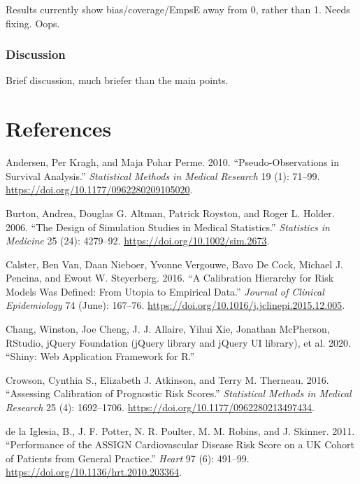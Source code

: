 \documentclass[
]{article}
\newlength{\cslhangindent}
\newenvironment{cslreferences}%
  {\setlength{\parindent}{0pt}%
  \everypar{\setlength{\hangindent}{\cslhangindent}}\ignorespaces}%
  {\par}
\begin{document}
Results currently show bias/coverage/EmpsE away from 0, rather than 1. Needs fixing. Oops.

\hypertarget{discussion-2}{%
\subsubsection{Discussion}\label{discussion-2}}

Brief discussion, much briefer than the main points.

\hypertarget{references}{%
\section*{References}\label{references}}

\hypertarget{refs}{}
\begin{cslreferences}
\leavevmode\hypertarget{ref-andersen_pseudo-observations_2010}{}%
Andersen, Per Kragh, and Maja Pohar Perme. 2010. ``Pseudo-Observations in Survival Analysis.'' \emph{Statistical Methods in Medical Research} 19 (1): 71--99. \url{https://doi.org/10.1177/0962280209105020}.

\leavevmode\hypertarget{ref-burton_design_2006}{}%
Burton, Andrea, Douglas G. Altman, Patrick Royston, and Roger L. Holder. 2006. ``The Design of Simulation Studies in Medical Statistics.'' \emph{Statistics in Medicine} 25 (24): 4279--92. \url{https://doi.org/10.1002/sim.2673}.

\leavevmode\hypertarget{ref-calster_calibration_2016-1}{}%
Calster, Ben Van, Daan Nieboer, Yvonne Vergouwe, Bavo De Cock, Michael J. Pencina, and Ewout W. Steyerberg. 2016. ``A Calibration Hierarchy for Risk Models Was Defined: From Utopia to Empirical Data.'' \emph{Journal of Clinical Epidemiology} 74 (June): 167--76. \url{https://doi.org/10.1016/j.jclinepi.2015.12.005}.

\leavevmode\hypertarget{ref-chang_shiny_2020}{}%
Chang, Winston, Joe Cheng, J. J. Allaire, Yihui Xie, Jonathan McPherson, RStudio, jQuery Foundation (jQuery library and jQuery UI library), et al. 2020. ``Shiny: Web Application Framework for R.''

\leavevmode\hypertarget{ref-crowson_assessing_2016}{}%
Crowson, Cynthia S., Elizabeth J. Atkinson, and Terry M. Therneau. 2016. ``Assessing Calibration of Prognostic Risk Scores.'' \emph{Statistical Methods in Medical Research} 25 (4): 1692--1706. \url{https://doi.org/10.1177/0962280213497434}.

\leavevmode\hypertarget{ref-de_la_iglesia_performance_2011}{}%
de la Iglesia, B., J. F. Potter, N. R. Poulter, M. M. Robins, and J. Skinner. 2011. ``Performance of the ASSIGN Cardiovascular Disease Risk Score on a UK Cohort of Patients from General Practice.'' \emph{Heart} 97 (6): 491--99. \url{https://doi.org/10.1136/hrt.2010.203364}.


\end{cslreferences}
\end{document}
